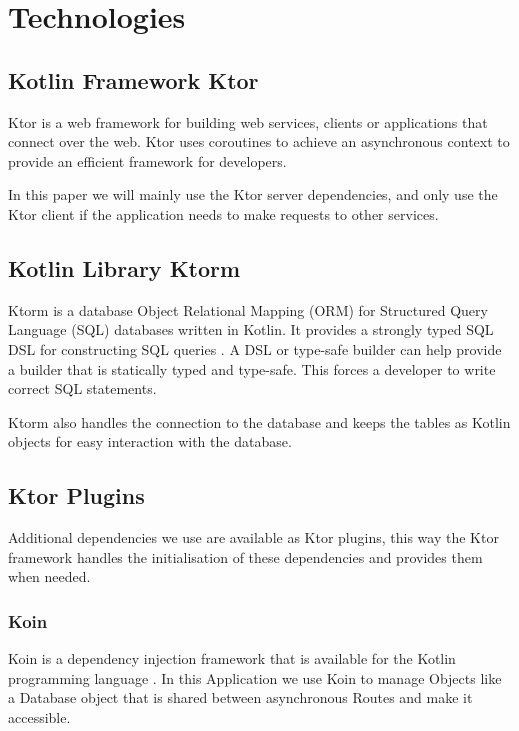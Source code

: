 \section{Technologies}

\label{sec:technologies}

\subsection{Kotlin Framework Ktor}

Ktor is a web framework for building web services, clients or applications that connect over the web. Ktor uses coroutines to achieve an asynchronous context to provide an efficient framework for developers.

In this paper we will mainly use the Ktor server dependencies, and only use the Ktor client if the application needs to make requests to other services.

\subsection{Kotlin Library Ktorm}

Ktorm is a database Object Relational Mapping (ORM) for Structured Query Language (SQL) databases written in Kotlin. It provides a strongly typed SQL DSL for constructing SQL queries \cite{Ktorm}. A DSL or type-safe builder \cite{DSL} can help provide a builder that is statically typed and type-safe. This forces a developer to write correct SQL statements.

Ktorm also handles the connection to the database and keeps the tables as Kotlin objects for easy interaction with the database.

\subsection{Ktor Plugins}

Additional dependencies we use are available as Ktor plugins, this way the Ktor framework handles the initialisation of these dependencies and provides them when needed.

\subsubsection{Koin}

Koin is a dependency injection framework that is available for the Kotlin programming language \cite{Koin}. In this Application we use Koin to manage Objects like a Database object that is shared between asynchronous Routes and make it accessible.

